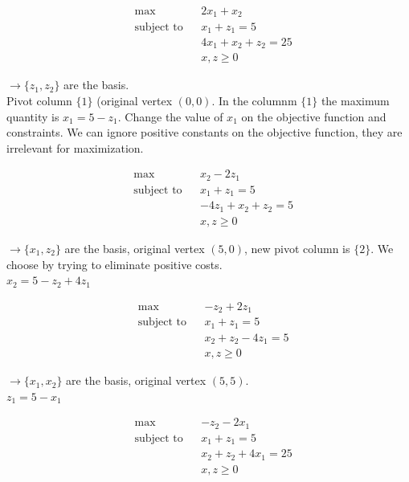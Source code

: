 \documentclass[main]{subfiles}
\begin{document}
\begin{equation*}
\begin{aligned}
& \max
& & 2x_1 + x_2 \\
& \text{subject to}
& & x_{1} + z_1 = 5 \\
&&& 4x_1 + x_2 + z_2 = 25\\
&&& x, z \geq 0
\end{aligned}
\end{equation*}

$\rightarrow \{z_1, z_2\}$ are the basis.\\

Pivot column $\{1\}$ (original vertex $(0,0)$. In the columnm $\{1\}$ the
maximum quantity is $x_1 = 5 - z_1$. Change the value of $x_1$ on the objective
function and constraints. We can ignore positive constants on the objective
function, they are irrelevant for maximization.

\begin{equation*}
\begin{aligned}
& \max
& & x_2 - 2z_1 \\
& \text{subject to}
& & x_{1} + z_1 = 5 \\
&&& -4z_1 + x_2 + z_2 = 5\\
&&& x, z \geq 0
\end{aligned}
\end{equation*}

$\rightarrow \{x_1, z_2\}$ are the basis, original vertex $(5,0)$, new pivot
column is $\{2\}$. We choose by trying to eliminate positive costs.\\
$x_2 = 5 - z_2 + 4z_1$

\begin{equation*}
\begin{aligned}
& \max
& & -z_2 + 2z_1 \\
& \text{subject to}
& & x_{1} + z_1 = 5 \\
&&& x_2 + z_2 -4z_1 = 5\\
&&& x, z \geq 0
\end{aligned}
\end{equation*}

$\rightarrow \{x_1, x_2\}$ are the basis, original vertex $(5,5)$.\\
$z_1 = 5 - x_1$

\begin{equation*}
\begin{aligned}
& \max
& & -z_2 - 2x_1 \\
& \text{subject to}
& & x_{1} + z_1 = 5 \\
&&& x_2 + z_2 +4x_1 = 25\\
&&& x, z \geq 0
\end{aligned}
\end{equation*}
\end{document}
